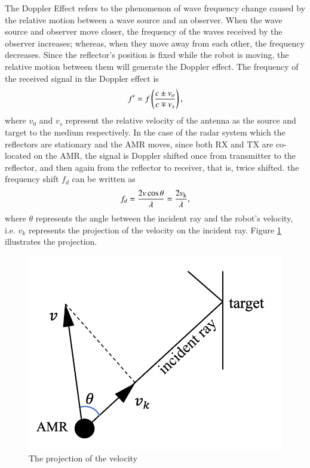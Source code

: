 \documentclass[12pt,DIV14,BCOR12mm,a4paper,footinclude=false,headinclude,parskip=half-,twoside,openright,cleardoublepage=empty,toc=index,bibliography=totoc,listof=totoc]{scrreprt}
\numberwithin{equation}{chapter}
\begin{document}
The Doppler Effect refers to the phenomenon of wave frequency change caused by the relative motion between a wave source and an observer. When the wave source and observer move closer, the frequency of the waves received by the observer increases; whereas, when they move away from each other, the frequency decreases. Since the reflector’s position is fixed while the robot is moving, the relative motion between them will generate the Doppler effect. The frequency of the received signal in the Doppler effect is
\begin{equation}
    \centering
    f' = f \left( \frac{c \pm v_o}{c \mp v_s} \right),
    \label{doppler shift formula}
\end{equation}
where $v_0$ and $v_s$ represent the relative velocity of the antenna as the source and target to the medium respectively. In the case of the radar system which the reflectors are stationary and the AMR moves, since both RX and TX are co-located on the AMR, the signal is Doppler shifted once from transmitter to the reflector, and then again from the reflector to receiver, that is, twice shifted. the frequency shift $f_d$ can be written as
\begin{equation}
    \centering
    f_d = \frac{2v \cos \theta}{\lambda} = \frac{2v\textsubscript{k}}{\lambda},
    \label{frequency shift formula}
\end{equation}
where $\theta$ represents the angle between the incident ray and the robot's velocity, i.e. $v_k$ represents the projection of the velocity on the incident ray. Figure \ref{the projection of the velocity} illustrates the projection.

\begin{figure}
	\centering
	\includegraphics[scale=.4]{figures/velocity_AMR.png}
	\caption{The projection of the velocity}
	\label{the projection of the velocity}
\end{figure}
\end{document}
